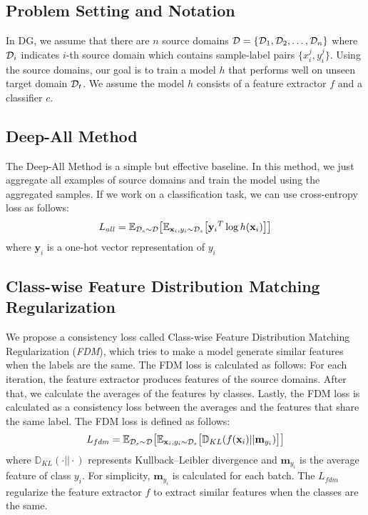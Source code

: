 \subsection{Problem Setting and Notation}
In DG, we assume that there are $n$ source domains $\mathcal{D} = \{\mathcal{D}_1, \mathcal{D}_2, \dots, \mathcal{D}_n\}$ where $\mathcal{D}_i$ indicates $i$-th source domain which contains sample-label pairs $\{x_i^j, y_i^j\}$. Using the source domains, our goal is to train a model $h$ that performs well on unseen target domain $\mathcal{D}_t$. We assume the model $h$ consists of a feature extractor $f$ and a classifier $c$. 

\subsection{Deep-All Method}
The Deep-All Method is a simple but effective baseline. In this method, we just aggregate all examples of source domains and train the model using the aggregated samples. If we work on a classification task, we can use cross-entropy loss as follows:
\begin{equation}
\label{eq:agg}
\begin{aligned}
L_{all} = \mathbb{E}_{\mathcal{D}_s\sim\mathcal{D}} \big[ \mathbb{E}_{\mathbf{x}_i,y_i\sim \mathcal{D}_s} \big[  {\mathbf{y}_i}^{T} \log h(\mathbf{x}_i) \big] \big]
\end{aligned}
\end{equation}
where $\mathbf{y}_i$ is a one-hot vector representation of $y_i$

\subsection{Class-wise Feature Distribution Matching Regularization}
We propose a consistency loss called Class-wise Feature Distribution Matching Regularization (\textit{FDM}), which tries to make a model generate similar features when the labels are the same. The FDM loss is calculated as follows: For each iteration, the feature extractor produces features of the source domains. After that, we calculate the averages of the features by classes. Lastly, the FDM loss is calculated as a consistency loss between the averages and the features that share the same label. The FDM loss is defined as follows:
\begin{equation}
\label{eq:fdm}
\begin{aligned}
L_{fdm} = \mathbb{E}_{\mathcal{D}_s\sim\mathcal{D}} \big[ \mathbb{E}_{\mathbf{x}_i,y_i\sim \mathcal{D}_s} \big[  \mathbb{D}_{KL}(f(\mathbf{x}_i)|| \mathbf{m}_{y_i}) \big] \big]
\end{aligned}
\end{equation}
where $\mathbb{D}_{KL}(\cdot || \cdot)$ represents Kullback–Leibler divergence and $\mathbf{m}_{y_i}$ is the average feature of class $y_i$. For simplicity, $\mathbf{m}_{y_i}$ is calculated for each batch. The $L_{fdm}$ regularize the feature extractor $f$ to extract similar features when the classes are the same.

